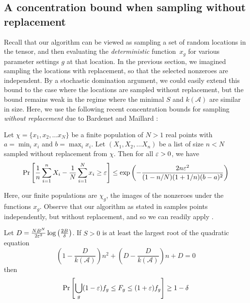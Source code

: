 \subsection{A concentration bound when sampling without replacement}

Recall that our algorithm can be viewed as sampling a set of random locations in the tensor, and then evaluating the \emph{deterministic} function~$x_g$ for various parameter settings $g$ at that location.
In the previous section, we imagined sampling the locations with replacement, so that the selected nonzeroes are independent.
By a stochastic domination argument, we could easily extend this bound to the case where the locations are sampled without replacement, but the bound remains weak in the regime where the minimal $S$ and $k(\mathcal{A})$ are similar in size.
Here, we use the following recent concentration bounds for sampling \emph{without replacement} due to Bardenet and Maillard \cite{BM2015}:

\begin{thm}
 \label{thm:hoeffding-serfling}
 Let $\chi = \{x_1, x_2, \dots x_N\}$ be a finite population of $N > 1$ real points with $a = \min_i x_i$ and $b = \max_i x_i$.
Let $(X_1, X_2, \dots X_n)$ be a list of size $n < N$ sampled without replacement from $\chi$.
Then for all $\varepsilon > 0$, we have
\[
\Pr\left[\frac{1}{n} \sum_{i = 1}^n X_i - \frac{1}{N} \sum_{i = 1}^N x_i \geq \varepsilon \right]
\leq \exp \left( - \frac{2 n \varepsilon^2}{(1 - n/N) (1 + 1/n) (b - a)^2} \right)
\]
\end{thm}

Here, our finite populations are $\chi_g$, the images of the nonzeroes under the functions $x_g$.
Observe that our algorithm as stated in  samples points independently, but without replacement, and so we can readily apply .

\begin{thm} \label{thm:without-replacement}
Let $D = \frac{N B^N}{2 \varepsilon^2} \log \left(\frac{2B}{\delta}\right)$.
If $S > 0$ is at least the largest root of the quadratic equation
\begin{equation} \label{eq:quadratic}
\left( 1 - \frac{D}{k(\mathcal{A})} \right) n^2 + \left(D - \frac{D}{k(\mathcal{A})} \right) n + D = 0
\end{equation}
then
\[
\Pr\left[ \bigcup_g (1 - \varepsilon) f_g \leq F_g \leq (1 + \varepsilon) f_g \right]
\geq 1 - \delta
\]
\end{thm}

